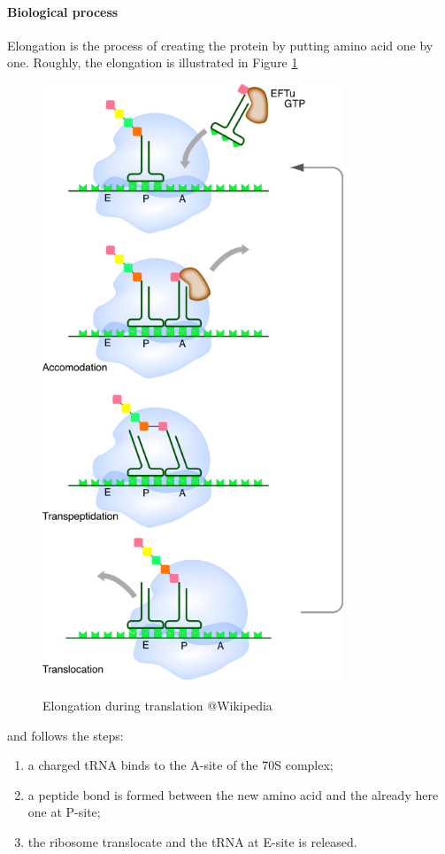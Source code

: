 \paragraph{Biological process} Elongation is the process of creating the protein by putting amino acid one by one. Roughly, the elongation is illustrated in Figure \ref{fig:elongationTranslate}
\begin{figure}[hbtp]
  \centering
  \includegraphics[width=9cm]{figure/proteinTranslationFromWikipediaModif.png}\\
  \caption{Elongation during translation @Wikipedia}\label{fig:elongationTranslate}
\end{figure}
and follows the steps:
\begin{enumerate}
  \item a charged tRNA binds to the A-site of the 70S complex;
  \item a peptide bond is formed between the new amino acid and the already here one at P-site;
  \item the ribosome translocate and the tRNA at E-site is released.
\end{enumerate}

